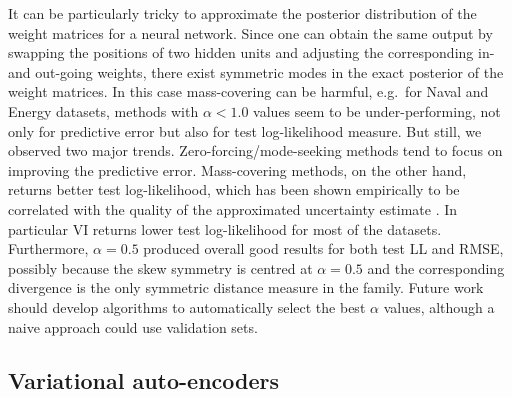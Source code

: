 It can be particularly tricky to approximate the posterior distribution of the weight matrices for a neural network. Since one can obtain the same output by swapping the positions of two hidden units and adjusting the corresponding in- and out-going weights, there exist symmetric modes in the exact posterior of the weight matrices. In this case mass-covering can be harmful, e.g.~for Naval and Energy datasets, methods with $\alpha < 1.0$ values seem to be under-performing, not only for predictive error but also for test log-likelihood measure. 
But still, we observed two major trends. Zero-forcing/mode-seeking methods tend to focus on improving the predictive error. Mass-covering methods, on the other hand, returns better test log-likelihood, which has been shown empirically to be correlated with the quality of the approximated uncertainty estimate \citep{hernandez-lobato:pbp2015, gal:uncertainty2016, depeweg:bnn_rl2016}. In particular VI returns lower test log-likelihood for most of the datasets. Furthermore, $\alpha = 0.5$ produced overall good results for both test LL and RMSE, possibly because the skew symmetry is centred at $\alpha = 0.5$ and the corresponding divergence is the only symmetric distance measure in the family. Future work should develop algorithms to automatically select the best $\alpha$ values, although a naive approach could use validation sets. 

\subsection{Variational auto-encoders}

